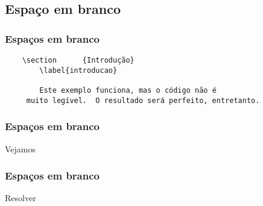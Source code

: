 \subsection{Espaço em branco}

\begin{frame}[fragile]
  \frametitle{Espaços em branco}
  \begin{verbatim}
    \section      {Introdução}
        \label{introducao}

        Este exemplo funciona, mas o código não é
     muito legível.  O resultado será perfeito, entretanto.
  \end{verbatim}
\end{frame}

\begin{frame}
  \frametitle{Espaços em branco}
  \huge
  Vejamos 
\end{frame}

\begin{frame}
  \frametitle{Espaços em branco}
  \huge
  Resolver 
\end{frame}
